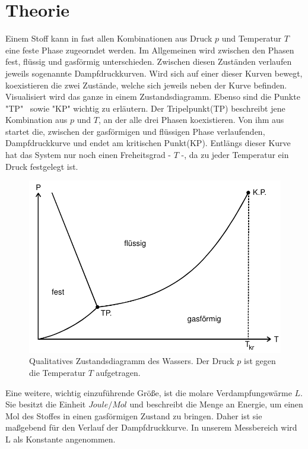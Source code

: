 \section{Theorie}
Einem Stoff kann in fast allen Kombinationen aus Druck $p$ und Temperatur $T$ eine feste Phase zugeorndet werden.
Im Allgemeinen wird zwischen den Phasen fest, flüssig und gasförmig unterschieden. Zwischen diesen Zuständen verlaufen jeweils
sogenannte Dampfdruckkurven. Wird sich auf einer dieser Kurven bewegt, koexistieren die zwei Zustände, welche sich jeweils neben der Kurve befinden.
Visualisiert  wird das ganze in einem Zustandsdiagramm. Ebenso sind die Punkte "TP" \, sowie "KP" wichtig zu erläutern. Der Tripelpunkt(TP) beschreibt jene Kombination
aus $p$ und $T$, an der alle drei Phasen koexistieren. Von ihm aus startet die, zwischen der gasförmigen und flüssigen Phase verlaufenden, Dampfdruckkurve und 
endet am kritischen Punkt(KP). Entlängs dieser Kurve hat das System nur noch einen Freheitsgrad - $T$ -, da zu jeder Temperatur ein Druck festgelegt ist.
\begin{figure}[h]
    \centering
    \includegraphics[scale=0.8]{"screen.jpg"}
    \caption{Qualitatives Zustandsdiagramm des Wassers. Der Druck $p$ ist gegen die Temperatur $T$ aufgetragen.}
    \label{Abb1:Zustandsdiagramm}
\end{figure}
\noindent
Eine weitere, wichtig einzuführende Größe, ist die molare Verdampfungswärme $L$. Sie besitzt die Einheit $\unit{Joule/Mol}$ und beschreibt die Menge an Energie, um einen Mol
des Stoffes in einen gasförmigen Zustand zu bringen. Daher ist sie maßgebend für den Verlauf der Dampfdruckkurve. In unserem Messbereich
wird L als Konstante angenommen.\\
